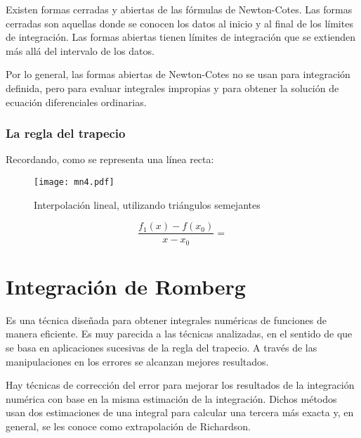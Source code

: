 Existen formas cerradas y abiertas de las fórmulas de Newton-Cotes. Las formas cerradas son aquellas donde se conocen los datos al inicio y al final de los límites de integración. Las formas abiertas tienen límites de integración que se extienden más allá del intervalo de los datos.

Por lo general, las formas abiertas de Newton-Cotes no se usan para integración definida, pero para evaluar integrales impropias y para obtener la solución de ecuación diferenciales ordinarias.

\subsubsection{ La regla del trapecio}
Recordando, como se representa una línea recta: 
\begin{figure}[h!]
\centering
  \texttt{[image: mn4.pdf]}
  \caption{Interpolación lineal, utilizando triángulos semejantes}
  \label{mn4}
\end{figure}
\begin{equation}
    \frac{f_1(x)- f(x_0)}{x -x_0} = 
\end{equation}

\section{Integración de Romberg}

Es una técnica diseñada para obtener integrales numéricas de funciones de manera eficiente. Es muy parecida a las técnicas analizadas, en el sentido de que se basa en aplicaciones sucesivas de la regla del trapecio. A través de las manipulaciones en los errores se alcanzan mejores resultados.

Hay técnicas de corrección del error para mejorar los resultados de la integración numérica con base en la misma estimación de la integración. Dichos métodos usan dos estimaciones de una integral para calcular una tercera más exacta y, en general, se les conoce como extrapolación de Richardson. 


